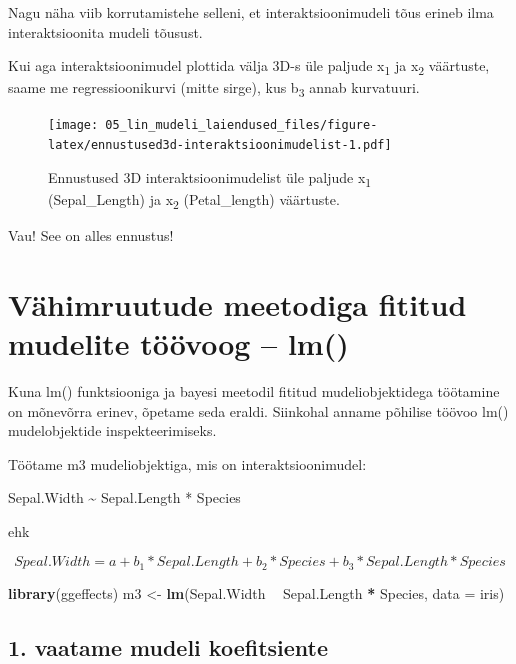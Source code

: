 \documentclass[]{book}
\newenvironment{Shaded}{\begin{snugshade}}{\end{snugshade}}
\newcommand{\DataTypeTok}[1]{\textcolor[rgb]{0.13,0.29,0.53}{#1}}
\newcommand{\KeywordTok}[1]{\textcolor[rgb]{0.13,0.29,0.53}{\textbf{#1}}}
\newcommand{\NormalTok}[1]{#1}
\newcommand{\OperatorTok}[1]{\textcolor[rgb]{0.81,0.36,0.00}{\textbf{#1}}}
\newcommand{\StringTok}[1]{\textcolor[rgb]{0.31,0.60,0.02}{#1}}
\begin{document}
Nagu näha viib korrutamistehe selleni, et interaktsioonimudeli tõus erineb ilma interaktsioonita mudeli tõusust.

Kui aga interaktsioonimudel plottida välja 3D-s üle paljude x\textsubscript{1} ja x\textsubscript{2} väärtuste, saame me regressioonikurvi (mitte sirge), kus b\textsubscript{3} annab kurvatuuri.



\begin{figure}
\centering
\texttt{[image: 05\_lin\_mudeli\_laiendused\_files/figure-latex/ennustused3d-interaktsioonimudelist-1.pdf]}
\caption{\label{fig:ennustused3d-interaktsioonimudelist}Ennustused 3D interaktsioonimudelist üle paljude x\textsubscript{1} (Sepal\_Length) ja x\textsubscript{2} (Petal\_length) väärtuste.}
\end{figure}

Vau! See on alles ennustus!

\hypertarget{vahimruutude-meetodiga-fititud-mudelite-toovoog-lm}{%
\chapter{Vähimruutude meetodiga fititud mudelite töövoog -- lm()}\label{vahimruutude-meetodiga-fititud-mudelite-toovoog-lm}}

Kuna lm() funktsiooniga ja bayesi meetodil fititud mudeliobjektidega töötamine on mõnevõrra erinev, õpetame seda eraldi. Siinkohal anname põhilise töövoo lm() mudelobjektide inspekteerimiseks.

Töötame m3 mudeliobjektiga, mis on interaktsioonimudel:

Sepal.Width \textasciitilde{} Sepal.Length * Species

ehk

\[Speal.Width = a + b_1*Sepal.Length + b_2*Species + b_3*Sepal.Length*Species\]

\begin{Shaded}
\begin{Highlighting}[]
\KeywordTok{library}\NormalTok{(ggeffects)}
\NormalTok{m3 <-}\StringTok{ }\KeywordTok{lm}\NormalTok{(Sepal.Width }\OperatorTok{~}\StringTok{ }\NormalTok{Sepal.Length }\OperatorTok{*}\StringTok{ }\NormalTok{Species, }\DataTypeTok{data =}\NormalTok{ iris)}
\end{Highlighting}
\end{Shaded}

\hypertarget{vaatame-mudeli-koefitsiente}{%
\section*{1. vaatame mudeli koefitsiente}\label{vaatame-mudeli-koefitsiente}}
\end{document}
